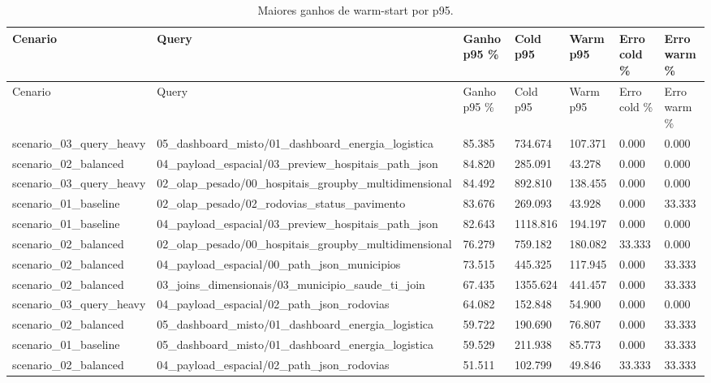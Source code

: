 {
\scriptsize
\setlength{\tabcolsep}{4pt}
\renewcommand{\arraystretch}{1.15}
\begin{longtable}{p{}p{}p{}p{}p{}p{}p{}}
\caption{Maiores ganhos de warm-start por p95.}\\
\toprule
Cenario & Query & Ganho p95 \% & Cold p95 & Warm p95 & Erro cold \% & Erro warm \% \\
\midrule
\endfirsthead
\toprule
Cenario & Query & Ganho p95 \% & Cold p95 & Warm p95 & Erro cold \% & Erro warm \% \\
\midrule
\endhead
scenario\_03\_query\_heavy & 05\_dashboard\_misto/01\_dashboard\_energia\_logistica & 85.385 & 734.674 & 107.371 & 0.000 & 0.000 \\
scenario\_02\_balanced & 04\_payload\_espacial/03\_preview\_hospitais\_path\_json & 84.820 & 285.091 & 43.278 & 0.000 & 0.000 \\
scenario\_03\_query\_heavy & 02\_olap\_pesado/00\_hospitais\_groupby\_multidimensional & 84.492 & 892.810 & 138.455 & 0.000 & 0.000 \\
scenario\_01\_baseline & 02\_olap\_pesado/02\_rodovias\_status\_pavimento & 83.676 & 269.093 & 43.928 & 0.000 & 33.333 \\
scenario\_01\_baseline & 04\_payload\_espacial/03\_preview\_hospitais\_path\_json & 82.643 & 1118.816 & 194.197 & 0.000 & 0.000 \\
scenario\_02\_balanced & 02\_olap\_pesado/00\_hospitais\_groupby\_multidimensional & 76.279 & 759.182 & 180.082 & 33.333 & 0.000 \\
scenario\_02\_balanced & 04\_payload\_espacial/00\_path\_json\_municipios & 73.515 & 445.325 & 117.945 & 0.000 & 33.333 \\
scenario\_02\_balanced & 03\_joins\_dimensionais/03\_municipio\_saude\_ti\_join & 67.435 & 1355.624 & 441.457 & 0.000 & 33.333 \\
scenario\_03\_query\_heavy & 04\_payload\_espacial/02\_path\_json\_rodovias & 64.082 & 152.848 & 54.900 & 0.000 & 0.000 \\
scenario\_02\_balanced & 05\_dashboard\_misto/01\_dashboard\_energia\_logistica & 59.722 & 190.690 & 76.807 & 0.000 & 33.333 \\
scenario\_01\_baseline & 05\_dashboard\_misto/01\_dashboard\_energia\_logistica & 59.529 & 211.938 & 85.773 & 0.000 & 33.333 \\
scenario\_02\_balanced & 04\_payload\_espacial/02\_path\_json\_rodovias & 51.511 & 102.799 & 49.846 & 33.333 & 33.333 \\

\end{longtable}}
